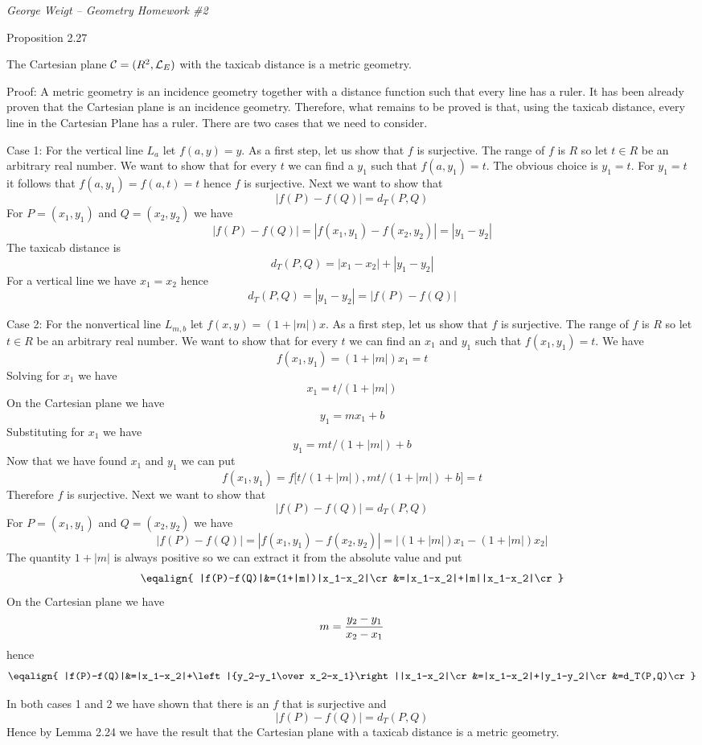 {\it George Weigt -- Geometry Homework \#2}

\beginsection Proposition 2.27

The Cartesian plane ${\cal C}=(R^2,{\cal L}_E)$ with the taxicab
distance is a metric geometry.

\medskip
Proof: A metric geometry is an incidence geometry
together with a distance function such that every line has a ruler.
It has been already proven that the Cartesian plane is an
incidence geometry.
Therefore, what remains to be proved is that, using the
taxicab distance, every line in the Cartesian Plane has a ruler.
There are two cases that we need to consider.

\medskip
Case 1: For the vertical line $L_a$ let $f(a,y)=y$.
As a first step, let us show that $f$ is surjective.
The range of $f$ is $R$ so let
$t\in R$ be an arbitrary real number.
We want to show that for every $t$ we can find a $y_1$
such that $f(a,y_1)=t$.
The obvious choice is $y_1=t$.
For $y_1=t$ it follows that $f(a,y_1)=f(a,t)=t$ hence $f$ is surjective.
%
Next we want to show that
$$|f(P)-f(Q)|=d_T(P,Q)$$
%
For $P=(x_1,y_1)$ and $Q=(x_2,y_2)$ we have
$$|f(P)-f(Q)|=|f(x_1,y_1)-f(x_2,y_2)|=|y_1-y_2|$$
%
The taxicab distance is
$$d_T(P,Q)=|x_1-x_2|+|y_1-y_2|$$
For a vertical line we have $x_1=x_2$ hence
$$d_T(P,Q)=|y_1-y_2|=|f(P)-f(Q)|$$

\medskip
Case 2:
For the nonvertical line $L_{m,b}$ let $f(x,y)=(1+|m|)x$.
As a first step, let us show that $f$ is surjective.
The range of $f$ is $R$ so
let $t\in R$ be an arbitrary real number.
We want to show that for every $t$ we can find an $x_1$ and $y_1$
such that $f(x_1,y_1)=t$.
We have
$$f(x_1,y_1)=(1+|m|)x_1=t$$
Solving for $x_1$ we have
$$x_1=t/(1+|m|)$$
On the Cartesian plane we have
$$y_1=mx_1+b$$
Substituting for $x_1$ we have
$$y_1=mt/(1+|m|)+b$$
Now that we have found $x_1$ and $y_1$ we can put
$$f(x_1,y_1)=f\big[t/(1+|m|),mt/(1+|m|)+b\big]=t$$
Therefore $f$ is surjective.
%
Next we want to show that
$$|f(P)-f(Q)|=d_T(P,Q)$$
%
For $P=(x_1,y_1)$ and $Q=(x_2,y_2)$ we have
$$|f(P)-f(Q)|=|f(x_1,y_1)-f(x_2,y_2)|=\big|(1+|m|)x_1-(1+|m|)x_2\big|$$
The quantity $1+|m|$ is always positive so we can extract it from the
absolute value and put
$$\eqalign{
|f(P)-f(Q)|&=(1+|m|)|x_1-x_2|\cr
&=|x_1-x_2|+|m||x_1-x_2|\cr
}$$
On the Cartesian plane we have
$$m={y_2-y_1\over x_2-x_1}$$
hence
$$\eqalign{
|f(P)-f(Q)|&=|x_1-x_2|+\left|{y_2-y_1\over x_2-x_1}\right||x_1-x_2|\cr
&=|x_1-x_2|+|y_1-y_2|\cr
&=d_T(P,Q)\cr
}$$

\medskip
In both cases 1 and 2 we have shown that there is an $f$ that is surjective and
$$|f(P)-f(Q)|=d_T(P,Q)$$
Hence by Lemma 2.24 we have the result that the Cartesian plane
with a taxicab distance is a metric geometry.

